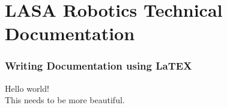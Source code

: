 \documentclass[portrait, 10pt, twoside]{book}
\newcommand{\currentpart}{}
\let\oldpart\part
\renewcommand{\part}[1]{\oldpart{#1}\renewcommand{\currentpart}{#1}}
\newcommand{\currentsection}{}
\let\oldsection\section
\renewcommand{\section}[1]{\oldsection{#1}\renewcommand{\currentsection}{#1}}
\begin{document}
\part{LASA Robotics Technical Documentation}
\section{Writing Documentation using LaTEX}
Hello world!\\
This needs to be more beautiful.
\end{document}

